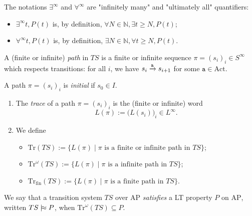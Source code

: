 \documentclass[./main]{subfiles}
\begin{document}
  \begin{rmk}
    The notations $\exists^\infty$ and $\forall^\infty$ are "infinitely many" and "ultimately all" quantifiers:
    \begin{itemize}
      \item $\exists^\infty t, P(t)$ is, by definition, $\forall N \in \mathds{N}, \exists t \ge N, P(t)$;
      \item $\forall^\infty t, P(t)$ is, by definition, $\exists N \in \mathds{N}, \forall t \ge N, P(t)$.
    \end{itemize}
  \end{rmk}

  \begin{defn}
    A (finite or infinite) \textit{path} in $TS$ is a finite or infinite sequence $\pi = (s_i)_{i} \in S^\infty$ which respects transitions: for all $i$, we have $s_i \mathrel{\xrightarrow{\mathtt{a}}} s_{i+1}$ for some $\mathtt{a} \in \mathrm{Act}$.

    A path $\pi = (s_i)_i$ is \textit{initial} if $s_0 \in I$.
  \end{defn}

  \begin{defn}[Trace]
    \begin{enumerate}
      \item The \textit{trace} of a path $\pi = (s_i)_i$ is the (finite or infinite) word 
        \[
        L(\pi) := \big(L(s_i)\big)_i \in L^\infty
        .\]
      \item We define
        \begin{itemize}
          \item $\mathrm{Tr}(TS) := \{L(\pi)  \mid \pi \text{ is a finite or infinite path in } TS\}$;
          \item $\mathrm{Tr}^\omega(TS) := \{L(\pi)  \mid \pi \text{ is a infinite path in } TS\}$;
          \item $\mathrm{Tr}_\mathrm{fin}(TS) := \{L(\pi)  \mid \pi \text{ is a finite path in } TS\}$.
        \end{itemize}
    \end{enumerate}
  \end{defn}

  \begin{defn}
    We say that a transition system $TS$ over $\mathrm{AP}$ \textit{satisfies} a LT property $P$ on $\mathrm{AP}$, written $TS \mathrel{{|}\!{\approx}} P$, when $\mathrm{Tr}^\omega(TS) \subseteq P$.
  \end{defn}
\end{document}
